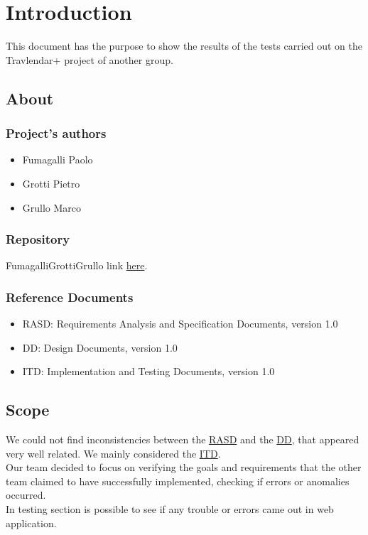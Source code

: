 \chapter{Introduction}
\label{cha:intro}

This document has the purpose to show the results of the tests carried out on the Travlendar+ project of another group.

\section{About}
\label{sec:about}
\subsection{Project's authors}
\begin{itemize}
\item Fumagalli Paolo
\item Grotti Pietro
\item Grullo Marco
\end{itemize}

\subsection{Repository}
FumagalliGrottiGrullo link \href{https://github.com/Aestor/FumagalliGrottiGullo}{here}.

\subsection{Reference Documents}
\begin{itemize}
\item RASD: Requirements Analysis and Specification Documents, version 1.0
\item DD: Design Documents, version 1.0
\item ITD: Implementation and Testing Documents, version 1.0
\end{itemize}

\section{Scope}
We could not find inconsistencies between the \href{https://github.com/Aestor/FumagalliGrottiGullo/blob/master/DeliveryFolder/RASD.pdf}{RASD} and the \href{https://github.com/Aestor/FumagalliGrottiGullo/blob/master/DeliveryFolder/DD1.pdf}{DD}, that appeared very well related. We mainly considered the \href{https://github.com/Aestor/FumagalliGrottiGullo/blob/master/DeliveryFolder/ITD1.pdf}{ITD}.\\Our team decided to focus on verifying the goals and requirements that the other team claimed to have successfully implemented, checking if errors or anomalies occurred.\\In testing section is possible to see if any trouble or errors came out in web application.

